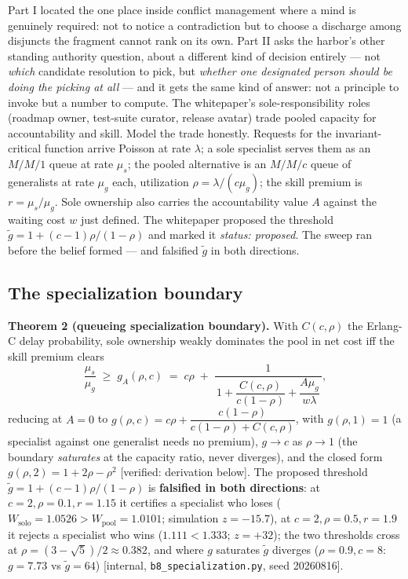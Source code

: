 \documentclass[11pt,a4paper]{article}
\begin{document}
Part I located the one place inside conflict management where a mind is genuinely required: not to notice a contradiction but to
choose a discharge among disjuncts the fragment cannot rank on its own. Part II asks the harbor's other standing authority
question, about a different kind of decision entirely --- not \emph{which} candidate resolution to pick, but \emph{whether one
designated person should be doing the picking at all} --- and it gets the same kind of answer: not a principle to invoke but a
number to compute. The whitepaper's sole-responsibility roles (roadmap owner, test-suite curator, release avatar) trade pooled
capacity for accountability and skill. Model the trade honestly. Requests for the invariant-critical function arrive Poisson at rate
$\lambda$; a sole specialist serves them as an $M/M/1$ queue at rate $\mu_s$; the pooled alternative is an $M/M/c$ queue of
generalists at rate $\mu_g$ each, utilization $\rho=\lambda/(c\mu_g)$; the skill premium is $r=\mu_s/\mu_g$. Sole ownership also
carries the accountability value $A$ against the waiting cost $w$ just defined. The whitepaper proposed the threshold $\tilde g = 1+(c-1)\rho/(1-\rho)$ and marked it \emph{status:
proposed}. The sweep ran before the belief formed --- and falsified $\tilde g$ in both directions.

\subsection*{The specialization boundary}
\begin{thebox}
\textbf{Theorem 2 (queueing specialization boundary).} With $C(c,\rho)$ the Erlang-C delay probability, sole ownership weakly
dominates the pool in net cost iff the skill premium clears
\[ \frac{\mu_s}{\mu_g} \;\ge\; g_A(\rho,c) \;=\; c\rho \;+\;
\frac{1}{\,1 + \dfrac{C(c,\rho)}{c(1-\rho)} + \dfrac{A\mu_g}{w\lambda}\,}, \]
reducing at $A=0$ to $g(\rho,c) = c\rho + \dfrac{c(1-\rho)}{c(1-\rho)+C(c,\rho)}$, with $g(\rho,1)=1$ (a specialist against one
generalist needs no premium), $g\to c$ as $\rho\to 1$ (the boundary \emph{saturates} at the capacity ratio, never diverges), and
the closed form $g(\rho,2)=1+2\rho-\rho^2$ [verified: derivation below]. The proposed threshold
$\tilde g = 1+(c-1)\rho/(1-\rho)$ is \textbf{falsified in both directions}: at $c{=}2,\rho{=}0.1,r{=}1.15$ it certifies a
specialist who loses ($W_{\mathrm{solo}}=1.0526 > W_{\mathrm{pool}}=1.0101$; simulation $z=-15.7$), at
$c{=}2,\rho{=}0.5,r{=}1.9$ it rejects a specialist who wins ($1.111 < 1.333$; $z=+32$); the two thresholds cross at
$\rho=(3-\sqrt5)/2\approx0.382$, and where $g$ saturates $\tilde g$ diverges ($\rho{=}0.9, c{=}8$: $g=7.73$ vs $\tilde g=64$)
[internal, \texttt{b8\_specialization.py}, seed 20260816].
\end{thebox}
\end{document}

